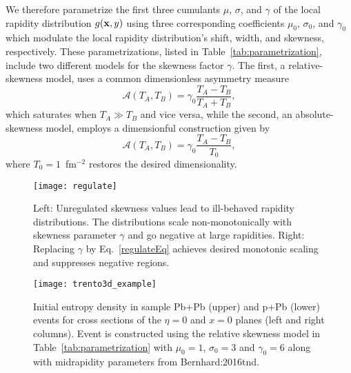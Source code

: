 We therefore parametrize the first three cumulants $\mu$, $\sigma$, and $\gamma$ of the local rapidity distribution $g(\mathbf x, y)$ using three corresponding coefficients $\mu_0$, $\sigma_0$, and $\gamma_0$ which modulate the local rapidity distribution's shift, width, and skewness, respectively.
These parametrizations, listed in Table~\ref{tab:parametrization}, include two different models for the skewness factor $\gamma$.
The first, a relative-skewness model, uses a common dimensionless asymmetry measure
\begin{equation}
  \mathcal{A}(T_A, T_B) = \gamma_0\frac{T_A - T_B}{T_A + T_B},
\end{equation}
which saturates when $T_A \gg T_B$ and vice versa, while the second, an absolute-skewness model, employs a dimensionful construction given by
\begin{equation}
  \mathcal{A}(T_A, T_B) = \gamma_0 \frac{T_A - T_B}{T_0},
\end{equation}
where $T_0=1$~fm$^{-2}$ restores the desired dimensionality.

\begin{figure}[t]
  \texttt{[image: regulate]}
  \caption{Left: Unregulated skewness values lead to ill-behaved rapidity distributions. The distributions scale non-monotonically with skewness parameter $\gamma$ and go negative at large rapidities. Right: Replacing $\gamma$ by Eq.~\eqref{regulateEq} achieves desired monotonic scaling and suppresses negative regions.}
  \label{fig:regulate}
\end{figure}

\begin{figure}[b]
  \texttt{[image: trento3d\_example]}
  \caption{Initial entropy density in sample Pb+Pb (upper) and p+Pb (lower) events for cross sections of the $\eta=0$ and $x=0$ planes (left and right columns). Event is constructed using the relative skewness model in Table~\ref{tab:parametrization} with $\mu_0=1$, $\sigma_0=3$ and $\gamma_0=6$ along with midrapidity parameters from {Bernhard:2016tnd}.}
  \label{fig:3d-example}
\end{figure}

